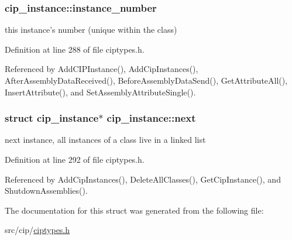 \hypertarget{structcip__instance_ae434a2726f036914d874e3b3b4521221}{
\subsubsection[{instance\-\_\-number}]{ {\bf cip\-\_\-instance\-::instance\-\_\-number}}}\label{d5/dc5/structcip__instance_ae434a2726f036914d874e3b3b4521221}
this instance's number (unique within the class) 

\-Definition at line 288 of file ciptypes.\-h.



\-Referenced by \-Add\-C\-I\-P\-Instance(), \-Add\-Cip\-Instances(), \-After\-Assembly\-Data\-Received(), \-Before\-Assembly\-Data\-Send(), \-Get\-Attribute\-All(), \-Insert\-Attribute(), and \-Set\-Assembly\-Attribute\-Single().

\hypertarget{structcip__instance_a5dd3dc3e7bbdd4643a417edd2aa6e37b}{
\subsubsection[{next}]{\setlength{\rightskip}{0pt plus 5cm}struct {\bf cip\-\_\-instance}$\ast$ {\bf cip\-\_\-instance\-::next}}}\label{d5/dc5/structcip__instance_a5dd3dc3e7bbdd4643a417edd2aa6e37b}
next instance, all instances of a class live in a linked list 

\-Definition at line 292 of file ciptypes.\-h.



\-Referenced by \-Add\-Cip\-Instances(), \-Delete\-All\-Classes(), \-Get\-Cip\-Instance(), and \-Shutdown\-Assemblies().



\-The documentation for this struct was generated from the following file\-:\begin{DoxyCompactItemize}
\item 
src/cip/\hyperlink{ciptypes_8h}{ciptypes.\-h}\end{DoxyCompactItemize}
